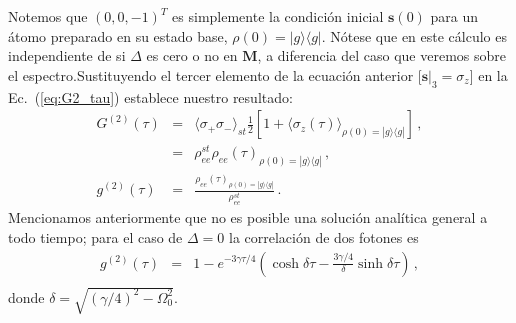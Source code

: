 \documentclass[twocolumn,aps,eqsecnum]{revtex4}
\begin{document}
Notemos que $(0,0,-1)^T$ es simplemente la condici\'on inicial 
$\mathbf{s} (0)$ para un \'atomo preparado en su estado base, 
$\rho(0) = |g \rangle \langle g|$. N\'otese que en este c\'alculo es 
independiente de si $\Delta$ es cero o no en $\mathbf{M}$, a diferencia 
del caso que veremos sobre el espectro.Sustituyendo el tercer elemento 
de la ecuaci\'on anterior [$\mathbf{s}|_3 = \sigma_z$] en la 
Ec.~(\ref{eq:G2_tau}) establece nuestro resultado: 
%
\begin{eqnarray}
G^{(2)}  (\tau) &=& \langle \sigma_+ \sigma_- \rangle_{st} \frac{1}{2} 
	\left[ 1+ \langle \sigma_z (\tau) \rangle_{\rho(0)= |g \rangle \langle g| }
 	\right] \,,  \nonumber \\ 
&=& \rho_{ee}^{st} \rho_{ee}(\tau)_{\rho(0)= |g \rangle \langle g| } \,, \\ 
%
g^{(2)}  (\tau) &=& \frac{ \rho_{ee}(\tau)_{\rho(0)= |g \rangle \langle g| }}
	{\rho_{ee}^{st}} \,.
 \end{eqnarray}
Mencionamos anteriormente que no es posible una soluci\'on anal\'itica 
general a todo tiempo; para el caso de $\Delta=0$ la correlaci\'on de dos 
fotones es   
%
\begin{eqnarray}
g^{(2)}  (\tau) &=& 1- e^{-3\gamma \tau /4} \left( \cosh{\delta \tau} 
	-\frac{3\gamma/4}{\delta} \sinh{\delta \tau} \right) \,, \nonumber \\
 \end{eqnarray}
donde $\delta = \sqrt{(\gamma/4)^2 -\Omega_0^2}$. 

\end{document}
